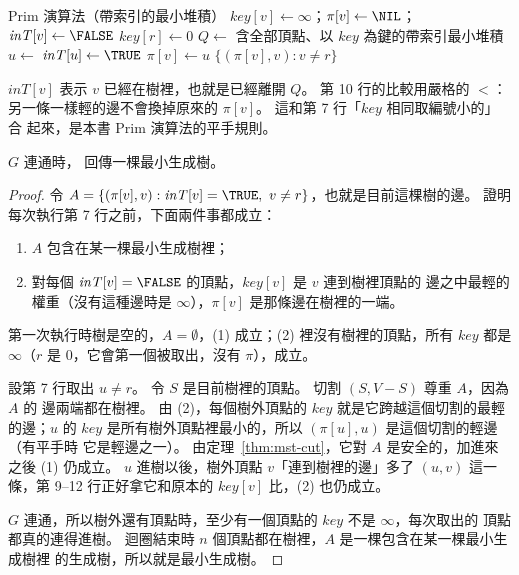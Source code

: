 \mstneed{7cm}
\begin{pseudo}[label=alg:mst-prim]{Prim 演算法（帶索引的最小堆積）}
        \State $\mathit{key}[v] \gets \infty$；$\pi[v] \gets \NIL$；$\mathit{inT}[v] \gets \FALSE$
    \EndFor
    \State $\mathit{key}[r] \gets 0$
    \State $Q \gets$ 含全部頂點、以 $\mathit{key}$ 為鍵的帶索引最小堆積
        \State $u \gets$  
        \State $\mathit{inT}[u] \gets \TRUE$
                \State $\pi[v] \gets u$
                \State {}
            \EndIf
        \EndFor
    \EndWhile
    \State \Return $\{(\pi[v], v) : v \ne r\}$
\EndProcedure
\end{pseudo}

$\mathit{inT}[v]$ 表示 $v$ 已經在樹裡，也就是已經離開 $Q$。 第 10 行的比較用嚴格的 $<$：
另一條一樣輕的邊不會換掉原來的 $\pi[v]$。 這和第 7 行「$\mathit{key}$ 相同取編號小的」合
起來，是本書 Prim 演算法的平手規則。

\begin{theorem}
\label{thm:mst-prim}
$G$ 連通時， 回傳一棵最小生成樹。
\end{theorem}

\begin{proof}
令 $A = \{(\pi[v], v) : \mathit{inT}[v] = \TRUE,\ v \ne r\}$，也就是目前這棵樹的邊。 證明
每次執行第 7 行之前，下面兩件事都成立：
\begin{enumerate}
\item $A$ 包含在某一棵最小生成樹裡；
\item 對每個 $\mathit{inT}[v] = \FALSE$ 的頂點，$\mathit{key}[v]$ 是 $v$ 連到樹裡頂點的
邊之中最輕的權重（沒有這種邊時是 $\infty$），$\pi[v]$ 是那條邊在樹裡的一端。
\end{enumerate}
第一次執行時樹是空的，$A = \emptyset$，(1) 成立；(2) 裡沒有樹裡的頂點，所有 $\mathit{key}$
都是 $\infty$（$r$ 是 $0$，它會第一個被取出，沒有 $\pi$），成立。

設第 7 行取出 $u \ne r$。 令 $S$ 是目前樹裡的頂點。 切割 $(S, V - S)$ 尊重 $A$，因為 $A$ 的
邊兩端都在樹裡。 由 (2)，每個樹外頂點的 $\mathit{key}$ 就是它跨越這個切割的最輕的邊；$u$
的 $\mathit{key}$ 是所有樹外頂點裡最小的，所以 $(\pi[u], u)$ 是這個切割的輕邊（有平手時
它是輕邊之一）。 由定理~\ref{thm:mst-cut}，它對 $A$ 是安全的，加進來之後 (1) 仍成立。 $u$
進樹以後，樹外頂點 $v$「連到樹裡的邊」多了 $(u, v)$ 這一條，第 9--12 行正好拿它和原本的
$\mathit{key}[v]$ 比，(2) 也仍成立。

$G$ 連通，所以樹外還有頂點時，至少有一個頂點的 $\mathit{key}$ 不是 $\infty$，每次取出的
頂點都真的連得進樹。 迴圈結束時 $n$ 個頂點都在樹裡，$A$ 是一棵包含在某一棵最小生成樹裡
的生成樹，所以就是最小生成樹。
\end{proof}

